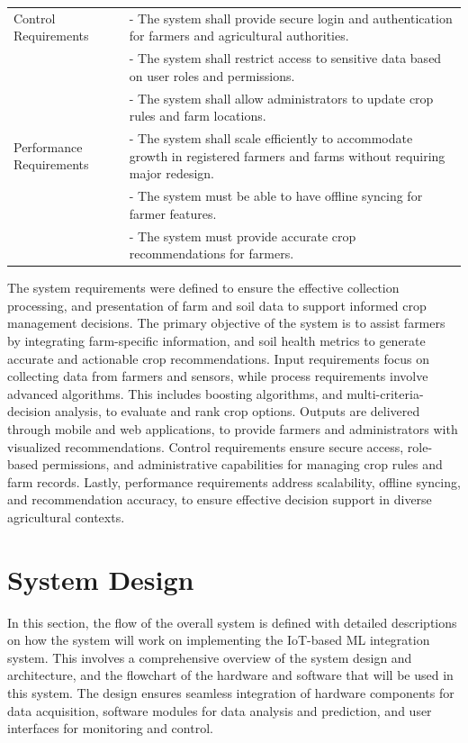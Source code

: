 {\begin{longtable}{p{4cm} p{9cm}}
		Control Requirements & - The system shall provide secure login and authentication for farmers and agricultural authorities. \\
		& - The system shall restrict access to sensitive data based on user roles and permissions. \\
		& - The system shall allow administrators to update crop rules and farm locations. \\
		\midrule
		
		Performance Requirements & - The system shall scale efficiently to accommodate growth in registered farmers and farms without requiring major redesign. \\
		& - The system must be able to have offline syncing for farmer features. \\
		& - The system must provide accurate crop recommendations for farmers. \\
	\end{longtable} 
	
	The system requirements were defined to ensure the effective collection processing, and presentation of farm and soil data to support informed crop management decisions. The primary objective of the system is to assist farmers by integrating farm-specific information, and soil health metrics to generate accurate and actionable crop recommendations. Input requirements focus on collecting data from farmers and sensors, while process requirements involve advanced algorithms. This includes boosting algorithms, and multi-criteria-decision analysis, to evaluate and rank crop options. Outputs are delivered through mobile and web applications, to provide farmers and administrators with visualized recommendations. Control requirements ensure secure access, role-based permissions, and administrative capabilities for managing crop rules and farm records. Lastly, performance requirements address scalability, offline syncing, and recommendation accuracy, to ensure effective decision support in diverse agricultural contexts.
	
	\section{System Design}
	In this section, the flow of the overall system is defined with detailed descriptions on how the system will work on implementing the IoT-based ML integration system. This involves a comprehensive overview of the system design and architecture, and the flowchart of the hardware and software that will be used in this system. The design ensures seamless integration of hardware components for  data acquisition, software modules for data analysis and prediction, and user interfaces for monitoring and control.
	
}
